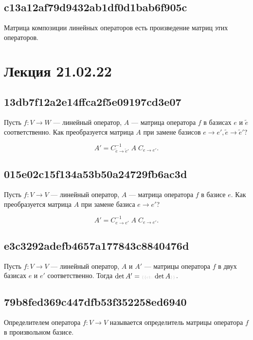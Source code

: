 \documentclass[11pt, a5paper]{article}
\let\oldsection\section
\renewcommand\section{\pagebreak\oldsection}
\newenvironment{note}[1]{\goodbreak\par\subsection{\hfill \color{lightgray}\tiny #1}}{}
\newenvironment{cloze}[2][\ldots]{\begin{leftbar}}{\end{leftbar}}
\newenvironment{icloze}[2][\ldots]{%
  \ignorespaces\text{\tiny \color{lightgray} \{\{c#2::}\hspace{0pt}%
}{%
  \hspace{0pt}\text{\tiny \color{lightgray}\}\}}\unskip%
}
\begin{document}
\begin{note}{c13a12af79d9432ab1df0d1bab6f905c}
    Матрица композиции линейных операторов есть \begin{icloze}{1}произведение матриц этих операторов.\end{icloze}
\end{note}

\section{Лекция 21.02.22}
\begin{note}{13db7f12a2e14ffca2f5e09197cd3e07}
    Пусть \( f : V \to W \) --- линейный оператор,  \( A \) --- матрица оператора \( f \) в базисах \( e \) и \( \tilde e \) соответственно. Как преобразуется матрица \( A \) при замене базисов \( e \to e', \tilde e \to \tilde e'? \)

    \begin{cloze}{1}
        \[
            A' = C^{-1}_{\tilde e \to \tilde e'} \; A \; C_{e \to e'}.
        \]
    \end{cloze}
\end{note}

\begin{note}{015e02c15f134a53b50a24729fb6ac3d}
    Пусть \( f : V \to V \) --- линейный оператор,  \( A \) --- матрица оператора \( f \) в базисе \( e \). Как преобразуется матрица \( A \) при замене базиса \( e \to e' \)?

    \begin{cloze}{1}
        \[
            A' = C^{-1}_{e \to e'} \; A \; C_{e \to e'}.
        \]
    \end{cloze}
\end{note}

\begin{note}{e3c3292adefb4657a177843c8840476d}
    Пусть \( f : V \to V \) --- линейный оператор, \( A \) и \( A' \) --- матрицы оператора \( f \) в двух базисах \( e \) и \( e' \) соответственно.
    Тогда \( \det A' = \begin{icloze}{1}\det A\end{icloze} \).
\end{note}

\begin{note}{79b8fed369c447dfb53f352258ed6940}
    \begin{icloze}{2}Определителем оператора \( f : V \to V \)\end{icloze} называется \begin{icloze}{1}о\-пре\-де\-ли\-тель матрицы оператора \( f \) в произвольном базисе.\end{icloze}
\end{note}
\end{document}
